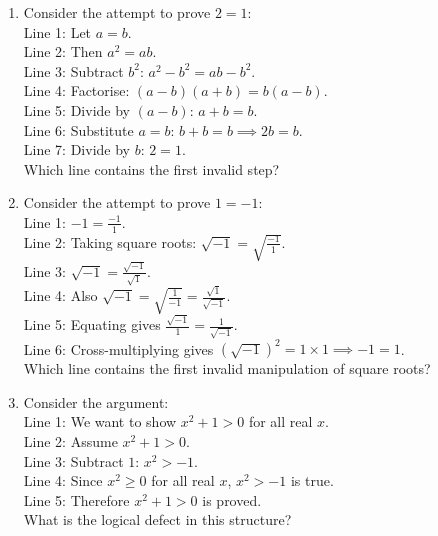 \documentclass[11pt,a4paper]{article}
\begin{document}
\begin{enumerate}

\item Consider the attempt to prove $2 = 1$:\\
Line 1: Let $a = b$.\\
Line 2: Then $a^2 = ab$.\\
Line 3: Subtract $b^2$: $a^2 - b^2 = ab - b^2$.\\
Line 4: Factorise: $(a-b)(a+b) = b(a-b)$.\\
Line 5: Divide by $(a-b)$: $a+b = b$.\\
Line 6: Substitute $a=b$: $b+b = b \implies 2b = b$.\\
Line 7: Divide by $b$: $2 = 1$.\\
Which line contains the first invalid step?


\item Consider the attempt to prove $1 = -1$:\\
Line 1: $-1 = \frac{-1}{1}$.\\
Line 2: Taking square roots: $\sqrt{-1} = \sqrt{\frac{-1}{1}}$.\\
Line 3: $\sqrt{-1} = \frac{\sqrt{-1}}{\sqrt{1}}$.\\
Line 4: Also $\sqrt{-1} = \sqrt{\frac{1}{-1}} = \frac{\sqrt{1}}{\sqrt{-1}}$.\\
Line 5: Equating gives $\frac{\sqrt{-1}}{1} = \frac{1}{\sqrt{-1}}$.\\
Line 6: Cross-multiplying gives $(\sqrt{-1})^2 = 1 \times 1 \implies -1 = 1$.\\
Which line contains the first invalid manipulation of square roots?


\item Consider the argument:\\
Line 1: We want to show $x^2 + 1 > 0$ for all real $x$.\\
Line 2: Assume $x^2 + 1 > 0$.\\
Line 3: Subtract $1$: $x^2 > -1$.\\
Line 4: Since $x^2 \ge 0$ for all real $x$, $x^2 > -1$ is true.\\
Line 5: Therefore $x^2 + 1 > 0$ is proved.\\
What is the logical defect in this structure?


\end{enumerate}
\end{document}
